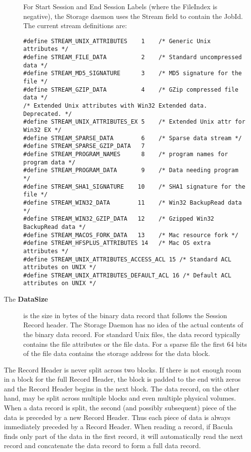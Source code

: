 \begin{description}
For Start Session and End Session Labels (where the FileIndex is negative), 
the Storage daemon uses the Stream field to contain the JobId.  The current
stream definitions are:  

\footnotesize
\begin{verbatim}
#define STREAM_UNIX_ATTRIBUTES    1    /* Generic Unix attributes */
#define STREAM_FILE_DATA          2    /* Standard uncompressed data */
#define STREAM_MD5_SIGNATURE      3    /* MD5 signature for the file */
#define STREAM_GZIP_DATA          4    /* GZip compressed file data */
/* Extended Unix attributes with Win32 Extended data.  Deprecated. */
#define STREAM_UNIX_ATTRIBUTES_EX 5    /* Extended Unix attr for Win32 EX */
#define STREAM_SPARSE_DATA        6    /* Sparse data stream */
#define STREAM_SPARSE_GZIP_DATA   7
#define STREAM_PROGRAM_NAMES      8    /* program names for program data */
#define STREAM_PROGRAM_DATA       9    /* Data needing program */
#define STREAM_SHA1_SIGNATURE    10    /* SHA1 signature for the file */
#define STREAM_WIN32_DATA        11    /* Win32 BackupRead data */
#define STREAM_WIN32_GZIP_DATA   12    /* Gzipped Win32 BackupRead data */
#define STREAM_MACOS_FORK_DATA   13    /* Mac resource fork */
#define STREAM_HFSPLUS_ATTRIBUTES 14   /* Mac OS extra attributes */
#define STREAM_UNIX_ATTRIBUTES_ACCESS_ACL 15 /* Standard ACL attributes on UNIX */
#define STREAM_UNIX_ATTRIBUTES_DEFAULT_ACL 16 /* Default ACL attributes on UNIX */
\end{verbatim}
\normalsize

\item [The {\bf DataSize} ]
   is the size in bytes of the binary data  record that follows the Session
Record header. The Storage Daemon  has no idea of the actual contents of the
binary data record. For  standard Unix files, the data record typically
contains the file  attributes or the file data. For a sparse file  the first
64 bits of the file data contains the storage  address for the data block. 
\end{description}

The Record Header is never split across two blocks. If there is not enough
room in a block for the full Record Header, the block is padded to the end
with zeros and the Record Header begins in the next block. The data record, on
the other hand, may be split across multiple blocks and even multiple physical
volumes. When a data record is split, the second (and possibly subsequent)
piece of the data is preceded by a new Record Header. Thus each piece of data
is always immediately preceded by a Record Header. When reading a record, if
Bacula finds only part of the data in the first record, it will automatically
read the next record and concatenate the data record to form a full data
record. 

